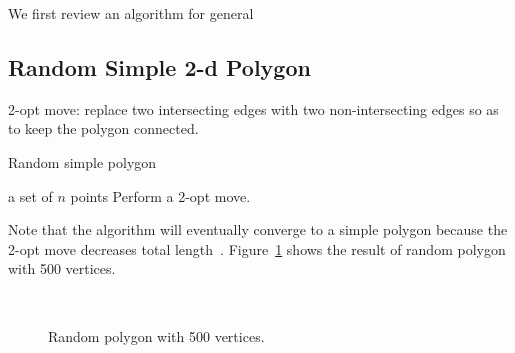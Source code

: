\documentclass{acm_proc_article-sp}          %
\begin{document}
We first review an algorithm for general
\subsection{Random Simple 2-d Polygon}
2-opt move: replace two intersecting edges with two non-intersecting
edges so as to keep the polygon connected.

\begin{algorithm}[ht]
\caption{Random simple polygon}
\label{alg:ellipsoid}
    \begin{algorithmic}[1]
     \REQUIRE a set of $n$ points
        \STATE Perform a 2-opt move.
      \ENDWHILE
    \end{algorithmic}
\end{algorithm}

Note that the algorithm will eventually converge to a simple polygon
because the 2-opt move decreases total length~\cite{zssm-grpgv-96}.
Figure~\ref{fig:polygon} shows the result of random polygon with 500
vertices.

\begin{figure}[ht]
  \centering
  \\
  \caption{Random polygon with 500 vertices.}\label{fig:polygon}
\end{figure}
\end{document}
